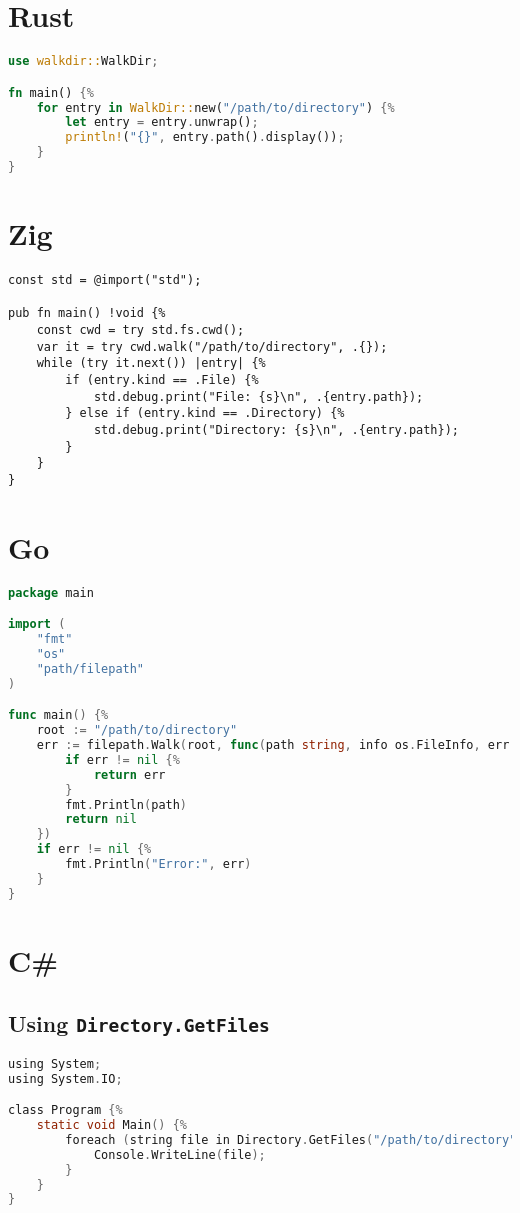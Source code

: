 \documentclass{article}
\begin{document}
\section{Rust}
\begin{lstlisting}[language=Rust]
use walkdir::WalkDir;

fn main() {%
    for entry in WalkDir::new("/path/to/directory") {%
        let entry = entry.unwrap();
        println!("{}", entry.path().display());
    }
}
\end{lstlisting}

\section{Zig}
\begin{lstlisting}
const std = @import("std");

pub fn main() !void {%
    const cwd = try std.fs.cwd();
    var it = try cwd.walk("/path/to/directory", .{});
    while (try it.next()) |entry| {%
        if (entry.kind == .File) {%
            std.debug.print("File: {s}\n", .{entry.path});
        } else if (entry.kind == .Directory) {%
            std.debug.print("Directory: {s}\n", .{entry.path});
        }
    }
}
\end{lstlisting}

\section{Go}
\begin{lstlisting}[language=Go]
package main

import (
	"fmt"
	"os"
	"path/filepath"
)

func main() {%
	root := "/path/to/directory"
	err := filepath.Walk(root, func(path string, info os.FileInfo, err error) error {%
		if err != nil {%
			return err
		}
		fmt.Println(path)
		return nil
	})
	if err != nil {%
		fmt.Println("Error:", err)
	}
}
\end{lstlisting}

\section{C\#}
\subsection{Using \texttt{Directory.GetFiles}}
\begin{lstlisting}[language=C]
using System;
using System.IO;

class Program {%
    static void Main() {%
        foreach (string file in Directory.GetFiles("/path/to/directory", "*", SearchOption.AllDirectories)) {%
            Console.WriteLine(file);
        }
    }
}
\end{lstlisting}
\end{document}
